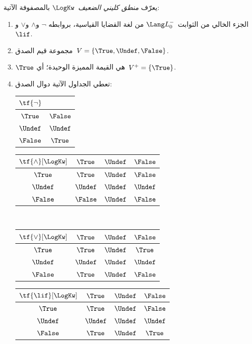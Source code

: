 \documentclass[../../../include/open-logic-section]{subfiles}
\begin{document}
\begin{defn}
يعرّف \emph{منطق كليني الضعيف}~$\LogKw$ بالمصفوفة الآتية:
\begin{enumerate}
  \item الجزء الخالي من الثوابت~$\Lang L_0^{-}$ من لغة القضايا القياسية، بروابطه
  $\lnot$ و$\land$ و$\lor$ و$\lif$.
  \item مجموعة قيم الصدق~$V = \{\True, \Undef, \False\}$.
  \item $\True$ هي القيمة المميزة الوحيدة؛ أي~$V^+ = \{\True\}$.
  \item تعطي الجداول الآتية دوال الصدق:
  \begin{center}
    \begin{tabular}{c|c}
      $\tf{\lnot}$ & \\
      \hline
      $\True$ & $\False$ \\
      $\Undef$ & $\Undef$ \\
      $\False$ & $\True$
    \end{tabular}
    \quad
    \begin{tabular}{c|ccc}
      $\tf{\land}[\LogKw]$ & $\True$ & $\Undef$ & $\False$ \\
      \hline
      $\True$ & $\True$ & $\Undef$ & $\False$ \\
      $\Undef$ & $\Undef$ & $\Undef$ & $\Undef$\\
      $\False$ & $\False$ & $\Undef$ & $\False$
    \end{tabular}
    \\[2ex]
    \begin{tabular}{c|ccc}
      $\tf{\lor}[\LogKw]$ & $\True$ & $\Undef$ & $\False$ \\
      \hline
      $\True$ & $\True$ & $\Undef$ & $\True$ \\
      $\Undef$ & $\Undef$ & $\Undef$ & $\Undef$ \\
      $\False$ & $\True$ & $\Undef$ & $\False$
    \end{tabular}
    \quad
    \begin{tabular}{c|ccc}
      $\tf{\lif}[\LogKw]$ & $\True$ & $\Undef$ & $\False$ \\
      \hline
      $\True$ & $\True$ & $\Undef$ & $\False$ \\
      $\Undef$ & $\Undef$ & $\Undef$ & $\Undef$  \\
      $\False$ & $\True$ & $\Undef$ & $\True$
    \end{tabular}
  \end{center}
\end{enumerate}
\end{defn}
\end{document}
